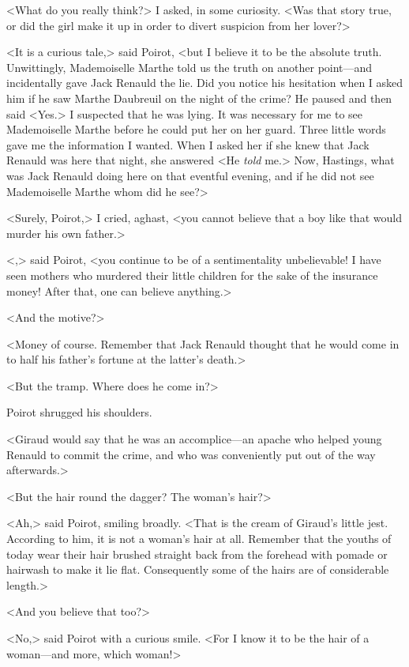  <What do you really think?> I asked, in some curiosity. <Was that story true, or did the girl make it up in order to divert suspicion from her lover?> 

 <It is a curious tale,> said Poirot, <but I believe it to be the absolute truth. Unwittingly, Mademoiselle Marthe told us the truth on another point—and incidentally gave Jack Renauld the lie. Did you notice his hesitation when I asked him if he saw Marthe Daubreuil on the night of the crime? He paused and then said <Yes.> I suspected that he was lying. It was necessary for me to see Mademoiselle Marthe before he could put her on her guard. Three little words gave me the information I wanted. When I asked her if she knew that Jack Renauld was here that night, she answered <He \emph{told} me.> Now, Hastings, what was Jack Renauld doing here on that eventful evening, and if he did not see Mademoiselle Marthe whom did he see?> 

 <Surely, Poirot,> I cried, aghast, <you cannot believe that a boy like that would murder his own father.> 

 <,> said Poirot, <you continue to be of a sentimentality unbelievable! I have seen mothers who murdered their little children for the sake of the insurance money! After that, one can believe anything.> 

 <And the motive?> 

 <Money of course. Remember that Jack Renauld thought that he would come in to half his father's fortune at the latter's death.> 

 <But the tramp. Where does he come in?> 

 Poirot shrugged his shoulders. 

 <Giraud would say that he was an accomplice—an apache who helped young Renauld to commit the crime, and who was conveniently put out of the way afterwards.> 

 <But the hair round the dagger? The woman's hair?> 

 <Ah,> said Poirot, smiling broadly. <That is the cream of Giraud's little jest. According to him, it is not a woman's hair at all. Remember that the youths of today wear their hair brushed straight back from the forehead with pomade or hairwash to make it lie flat. Consequently some of the hairs are of considerable length.> 

 <And you believe that too?> 

 <No,> said Poirot with a curious smile. <For I know it to be the hair of a woman—and more, which woman!> 

